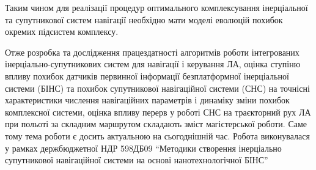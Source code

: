 Таким чином для реалізації процедур оптимального 
комплексування  інерціальної та супутникової систем навігації 
необхідно мати моделі еволюцій похибок окремих підсистем комплексу.

Отже розробка та дослідження працездатності алгоритмів роботи інтегрованих 
інерціально-супутникових систем для навігації і керування ЛА, оцінка 
ступіню впливу похибок датчиків первинної інформації безплатформної 
інерціальної системи (БІНС) та похибок супутникової навігаційної системи 
(СНС) на точнісні характеристики числення навігаційних параметрів і динаміку 
зміни похибок комплексної системи, оцінка впливу перерв у роботі СНС на 
траєкторний рух ЛА при польоті за складним маршрутом складають зміст 
магістерської роботи. Саме тому тема роботи є досить актуальною на 
сьогоднішній час. Робота виконувалася у рамках держбюджетної 
НДР 598ДБ09 ``Методики створення інерціально супутникової навігаційної
системи на основі нанотехнологічної БІНС”